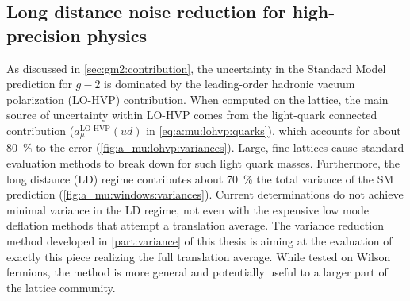 
\subsection{Long distance noise reduction for high-precision physics}







As discussed in \cref{sec:gm2:contribution}, the uncertainty in the Standard Model prediction for $g-2$ is dominated by the leading-order hadronic vacuum polarization (LO-HVP) contribution.
When computed on the lattice, the main source of uncertainty within LO-HVP comes from the light-quark connected contribution ($a_{\mu}^{\text{LO-HVP}}(ud)$ in \cref{eq:a:mu:lohvp:quarks}), which accounts for about \SI{80}{\percent} to the error (\cref{fig:a_mu:lohvp:variances}).
Large, fine lattices cause standard evaluation methods to break down for such light quark masses.
Furthermore, the long distance (LD) regime contributes about \SI{70}{\percent} the total variance of the SM prediction (\cref{fig:a_mu:windows:variances}).
Current determinations do not achieve minimal variance in the LD regime, not even with the expensive low mode deflation methods that attempt a translation average.
The variance reduction method developed in \cref{part:variance} of this thesis is aiming at the evaluation of exactly this piece realizing the full translation average.
While tested on Wilson fermions, the method is more general and potentially useful to a larger part of the lattice community.

